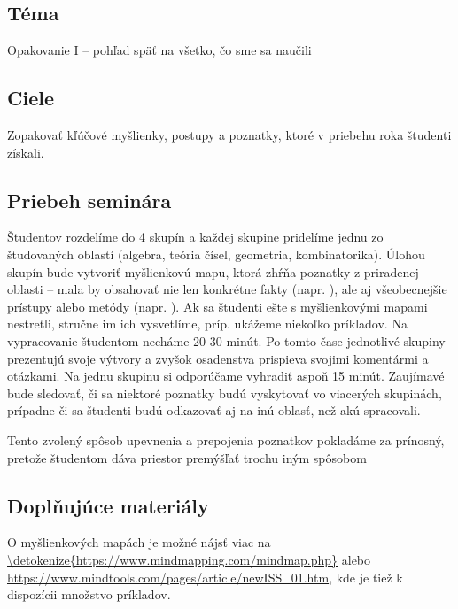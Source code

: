 
\subsection*{Téma}
Opakovanie I -- pohľad späť na všetko, čo sme sa naučili

\subsection*{Ciele}

Zopakovať kľúčové myšlienky, postupy a poznatky, ktoré v priebehu roka študenti získali.

\subsection*{Priebeh seminára}


Študentov rozdelíme do 4 skupín a každej skupine pridelíme jednu zo študovaných oblastí (algebra, teória čísel, geometria, kombinatorika). Úlohou skupín bude vytvoriť myšlienkovú mapu, ktorá zhŕňa poznatky z priradenej oblasti -- mala by obsahovať nie len konkrétne fakty (napr. ), ale aj všeobecnejšie prístupy alebo metódy (napr. ).  Ak sa študenti ešte s myšlienkovými mapami nestretli, stručne im ich vysvetlíme, príp. ukážeme niekoľko príkladov. Na vypracovanie študentom necháme 20-30 minút. Po tomto čase jednotlivé skupiny prezentujú svoje výtvory a zvyšok osadenstva prispieva svojimi komentármi a otázkami. Na jednu skupinu si odporúčame vyhradiť aspoň 15 minút. Zaujímavé bude sledovať, či sa niektoré poznatky budú vyskytovať vo viacerých skupinách, prípadne či sa študenti budú odkazovať aj na inú oblasť, než akú spracovali.

Tento zvolený spôsob upevnenia a prepojenia poznatkov pokladáme za prínosný, pretože študentom dáva priestor premýšľať trochu iným spôsobom 


\subsection*{Doplňujúce materiály}

O myšlienkových mapách je možné nájsť viac na \url{\detokenize{https://www.mindmapping.com/mindmap.php}} alebo \url{https://www.mindtools.com/pages/article/newISS_01.htm}, kde je tiež k dispozícii množstvo príkladov.


